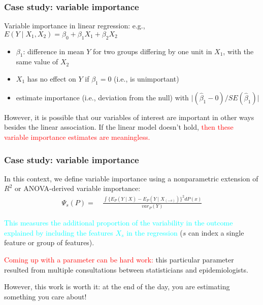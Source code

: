 \documentclass[12pt, 
hyperref={colorlinks=true, linkcolor=blue, urlcolor=cyan}]{beamer}
\begin{document}
\begin{frame}
\frametitle{Case study: variable importance}
Variable importance in linear regression: e.g., $E(Y \mid X_1, X_2) = \beta_0 + \beta_1 X_1 + \beta_2 X_2$
\begin{itemize}
\item $\beta_1$: difference in mean $Y$ for two groups differing by one unit in $X_1$, with the same value of $X_2$
\item $X_1$ has no effect on $Y$ if $\beta_1 = 0$ (i.e., is unimportant)
\item estimate importance (i.e., deviation from the null) with $\lvert (\hat{\beta}_1 - 0)/SE(\hat{\beta}_1) \rvert$
\end{itemize}

However, it is possible that our variables of interest are important in other ways besides the linear association. If the linear model doesn't hold, \textcolor{red}{then these variable importance estimates are meaningless.}
\end{frame}


\begin{frame}
\frametitle{Case study: variable importance}
In this context, we define variable importance using a nonparametric extension of $R^2$ or ANOVA-derived variable importance:
\begin{align*}
\Psi_s(P) = &\ \frac{\int \{E_P(Y \mid X) - E_P(Y \mid X_{(-s)})\}^2 dP(x)}{var_P(Y)}
\end{align*}

\textcolor{cyan}{This measures the additional proportion of the variability in the outcome explained by including the features $X_s$ in the regression} ($s$ can index a single feature or group of features).

\textcolor{red}{Coming up with a parameter can be hard work:} this particular parameter resulted from multiple consultations between statisticians and epidemiologists.

However, this work is worth it: at the end of the day, you are estimating something you care about!
\end{frame}
\end{document}
